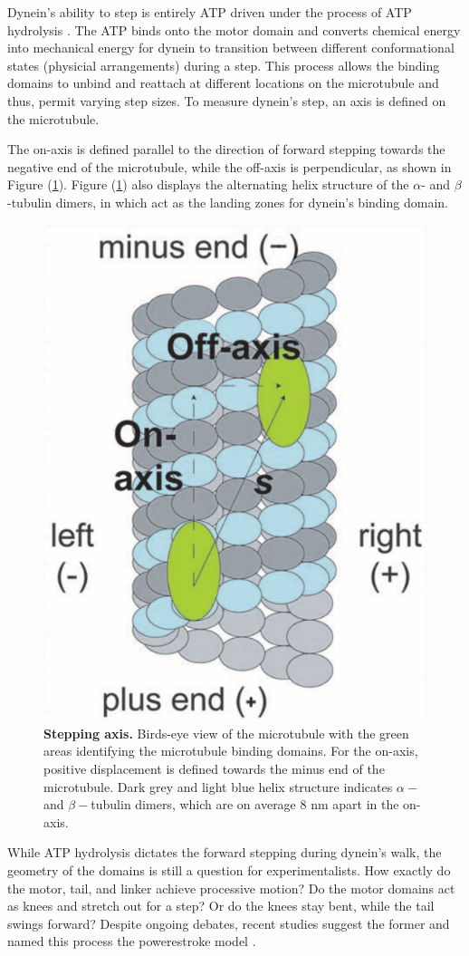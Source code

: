 Dynein's ability to step is entirely ATP driven under the process of ATP hydrolysis \cite{manna2020mechanistic, elshenawy2020lis1}. The ATP binds onto the motor domain and converts chemical energy into mechanical energy for dynein to transition between different conformational states (physicial arrangements) during a step. This process allows the binding domains to unbind and reattach at different locations on the microtubule and thus, permit varying step sizes. To measure dynein's step, an axis is defined on the microtubule.

The on-axis is defined parallel to the direction of forward stepping towards the negative end of the microtubule, while the off-axis is perpendicular, as shown in Figure (\ref{fig:axis}). Figure (\ref{fig:axis}) also displays the alternating helix structure of the $\alpha$- and $\beta$-tubulin dimers, in which act as the landing zones for dynein's binding domain.  

\begin{figure}[H]
	\centering
	\includegraphics[width=0.3\columnwidth]{Figures/Onaxis.png}
	\caption[Stepping Axis]{\textbf{Stepping axis.} Birds-eye view of the microtubule with the green areas identifying the microtubule binding domains. For the on-axis, positive displacement is defined towards the minus end of the microtubule. Dark grey and light blue helix structure indicates $\alpha-$ and $\beta-$tubulin dimers, which are on average 8 nm apart in the on-axis. \cite{Dewitt2012} }
	\label{fig:axis}
\end{figure}

While ATP hydrolysis dictates the forward stepping during dynein's walk, the geometry of the domains is still a question for experimentalists. How exactly do the motor, tail, and linker achieve processive motion? Do the motor domains act as knees and stretch out for a step? Or do the knees stay bent, while the tail swings forward? Despite ongoing debates, recent studies suggest the former and named this process the powerestroke model \cite{Burgess2003}. 



